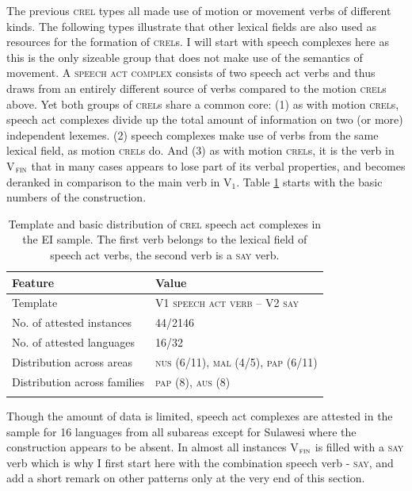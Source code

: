 The previous \textsc{crel} types all made use of motion or movement verbs of different kinds. The following types  illustrate that other lexical fields are also used as resources for the formation of \textsc{crel}s. I will start with speech complexes here as this is the only sizeable group that does not make use of the semantics of movement. A \textsc{speech act complex} consists of two speech act verbs and thus draws from an entirely different source of verbs compared to the motion \textsc{crel}s above. Yet both groups of \textsc{crel}s share a common core: (1) as with motion \textsc{crel}s, speech act complexes divide up the total amount of information on two (or more) independent lexemes. (2) speech complexes make use of verbs from the same lexical field, as motion \textsc{crel}s do. And (3) as with motion \textsc{crel}s, it is the verb in V$_{\textsc{fin}}$ that in many cases appears to lose part of its verbal properties, and becomes deranked in comparison to the main verb in V$_{1}$. Table \ref{table:basiccrelspeech} starts with the basic numbers of the construction.

\begin{table}
\begin{tabular}{ll}
\lsptoprule
Feature&Value\tabularnewline
\midrule
Template&V1 \textsc{speech act verb} -- V2 \textsc{\textsc{say}}\tabularnewline
No. of attested instances& 44/2146 \tabularnewline
No. of attested languages& 16/32 \tabularnewline
Distribution across areas& \textsc{nus} (6/11), \textsc{mal} (4/5), \textsc{pap} (6/11) \tabularnewline
Distribution across families& \textsc{pap} (8), \textsc{aus} (8) \tabularnewline
\lspbottomrule
\end{tabular}
\caption[Template and basic distribution of \textsc{crel} speech act complexes]{Template and basic distribution of \textsc{crel} speech act complexes in the EI sample. The first verb belongs to the lexical field of speech act verbs, the second verb is a \textsc{say} verb.}
\label{table:basiccrelspeech}
\end{table}

Though the amount of data is limited, speech act complexes are attested in the sample for 16 languages from all subareas except for Sulawesi where the construction appears to be absent. In almost all instances V$_{\textsc{fin}}$ is filled with a \textsc{say} verb which is why I first start here with the combination speech verb - \textsc{say}, and add a short remark on other patterns only at the very end of this section. 

